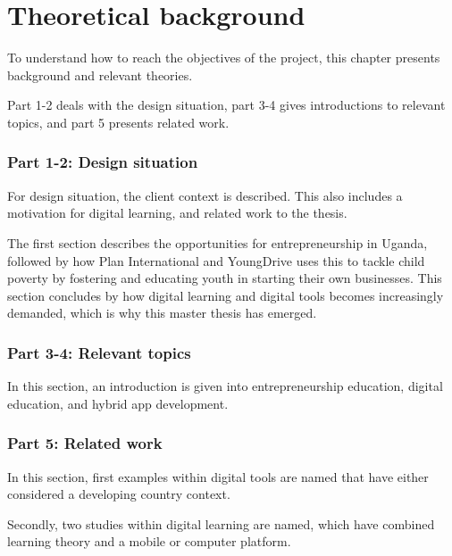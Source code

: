 %

\section{Theoretical background}

To understand how to reach the objectives of the project, this chapter presents background and relevant theories.

Part 1-2 deals with the design situation, part 3-4 gives introductions to relevant topics, and part 5 presents related work.

\subsubsection{Part 1-2: Design situation}
For design situation, the client context is described. This also includes a motivation for digital learning, and related work to the thesis.

The first section describes the opportunities for entrepreneurship in Uganda, followed by how Plan International and YoungDrive uses this to tackle child poverty by fostering and educating youth in starting their own businesses. This section concludes by how digital learning and digital tools becomes increasingly demanded, which is why this master thesis has emerged.

\subsubsection{Part 3-4: Relevant topics}
In this section, an introduction is given into entrepreneurship education, digital education, and hybrid app development.

\subsubsection{Part 5: Related work}
In this section, first examples within digital tools are named that have either considered a developing country context.

Secondly, two studies within digital learning are named, which have combined learning theory and a mobile or computer platform.






